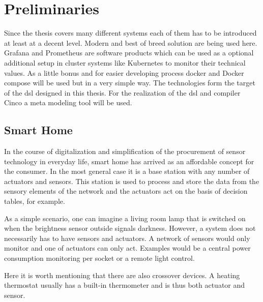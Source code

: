 \chapter{Preliminaries}
\label{chapter:grundlagen}
Since the thesis covers many different systems each of them has to be introduced at least at a decent level. Modern and best of breed solution are being used here. Grafana and Prometheus are software products which can be used as a optional additional setup in cluster systems like Kubernetes to monitor their technical values. As a little bonus and for easier developing process docker and Docker compose will be used but in a very simple way. The technologies form the target of the \gls{dsl} designed in this thesis. For the realization of the \gls{dsl} and compiler Cinco a meta modeling tool will be used.
 
\section{Smart Home}
In the course of digitalization and simplification of the procurement of sensor technology in everyday life, smart home has arrived as an affordable concept for the consumer. In the most general case it is a base station with any number of actuators and sensors. This station is used to process and store the data from the sensory elements of the network and the actuators act on the basis of decision tables, for example. 

As a simple scenario, one can imagine a living room lamp that is switched on when the brightness sensor outside signals darkness. However, a system does not necessarily has to have sensors and actuators. A network of sensors would only monitor and one of actuators can only act. Examples would be a central power consumption monitoring per socket or a remote light control.

Here it is worth mentioning that there are also crossover devices. A heating thermostat usually has a built-in thermometer and is thus both actuator and sensor.

